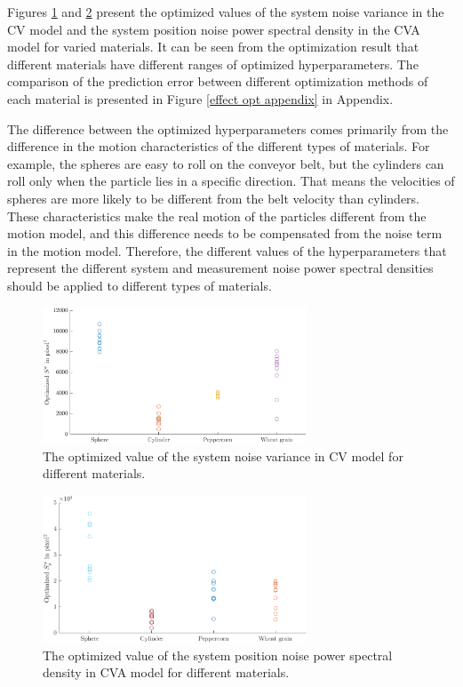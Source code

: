 Figures \ref{cluster1} and \ref{cluster2} present the optimized values of the system noise variance in the CV model and the system position noise power spectral density in the CVA model for varied materials.
It can be seen from the optimization result that different materials have different ranges of optimized hyperparameters. The comparison of the prediction error between different optimization methods of each material is presented in Figure \ref{effect opt appendix} in Appendix.

The difference between the optimized hyperparameters comes primarily from the difference in the motion characteristics of the different types of materials. For example, the spheres are easy to roll on the conveyor belt, but the cylinders can roll only when the particle lies in a specific direction. That means the velocities of spheres are more likely to be different from the belt velocity than cylinders. These characteristics make the real motion of the particles different from the motion model, and this difference needs to be compensated from the noise term in the motion model. Therefore, the different values of the hyperparameters that represent the different system and measurement noise power spectral densities should be applied to different types of materials.

\begin{figure}[htb]
\centering
\includegraphics[width=0.7\textwidth]{figures/KF/bayopt/opt all CV.png}
\caption{The optimized value of the system noise variance in CV model for different materials.}
\label{cluster1}
\end{figure}

\begin{figure}[htb]
\centering
\includegraphics[width=0.7\textwidth]{figures/KF/bayopt/opt all CVA.png}
\caption{The optimized value of the system position noise power spectral density in CVA model for different materials.}
\label{cluster2}
\end{figure}

